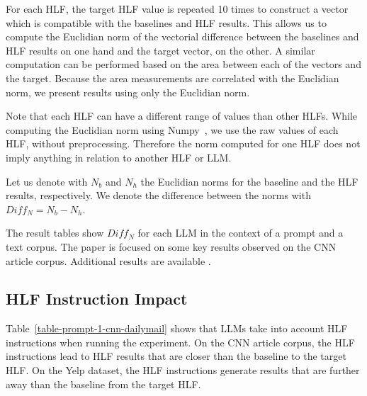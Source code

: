 \documentclass[a4paper,twoside]{article}
\begin{document}
For each HLF, the target HLF value is repeated 10 times to construct a vector
which is compatible with the baselines and HLF results.
This allows us to compute the Euclidian norm of the vectorial difference between
the baselines and HLF results on one hand and the target vector, on the other.
A similar computation can be performed based on the area between each of the
vectors and the target.
Because the area measurements are correlated with the Euclidian norm, we present
results using only the Euclidian norm.

Note that each HLF can have a different range of values than other HLFs.
While computing the Euclidian norm using Numpy~\cite{harris2020array}, we use
the raw values of each HLF, without preprocessing.
Therefore the norm computed for one HLF does not imply anything in relation to
another HLF or LLM.\@

Let us denote with $N_b$ and $N_h$ the Euclidian norms for the baseline and the
HLF results, respectively.
We denote the difference between the norms with $Diff_N = N_b - N_h$.

The result tables show $Diff_N$ for each LLM in the context of a prompt and a
text corpus.
The paper is focused on some key results observed on the CNN article corpus.
Additional results are available
.

\subsection{HLF Instruction Impact}

Table~\ref{table-prompt-1-cnn-dailymail} shows that LLMs take into account
HLF instructions when running the experiment.
On the CNN article corpus, the HLF instructions lead to HLF results that are
closer than the baseline to the target HLF.\@
On the Yelp dataset, the HLF instructions generate results that are further away
than the baseline from the target HLF.\@
\end{document}
